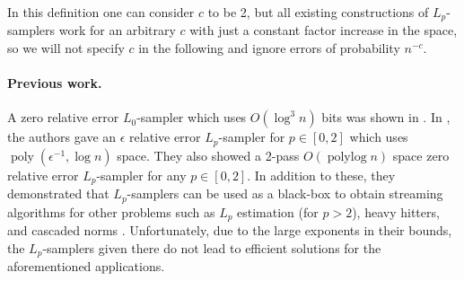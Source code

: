 \documentclass[9pt,letterpaper]{article}
\theoremstyle{remark}
\DeclareMathOperator{\polylog}{polylog}
\DeclareMathOperator{\poly}{poly}
\begin{document}
In this definition one can consider $c$ to be 2, but all existing
constructions of $L_p$-samplers work for an arbitrary $c$ with just a
constant factor increase in the space, so we will not specify $c$ in the
following and ignore errors of probability $n^{-c}$.
 
\paragraph{Previous work.} 
A zero relative error $L_0$-sampler which uses $O(\log^3 n)$ bits was shown in \cite{FrahlingIS05}. In \cite{MonemizadehW10}, the authors gave an $\epsilon$ relative error
$L_p$-sampler for $p \in [0,2]$ which uses $\poly(\epsilon^{-1},\log n)$ space. They also showed 
  a 2-pass $O(\polylog n)$ space zero relative error $L_p$-sampler for any $p\in [0,2]$. In addition
  to these, they demonstrated that $L_p$-samplers can be used as a black-box to obtain
   streaming algorithms for other problems such as $L_p$ estimation (for $p >2$), heavy hitters, 
   and cascaded norms \cite{JayramW09}.
   Unfortunately, due to the large exponents in their bounds, the
  $L_p$-samplers given there do not lead to efficient solutions for the aforementioned applications.
  
\end{document}
